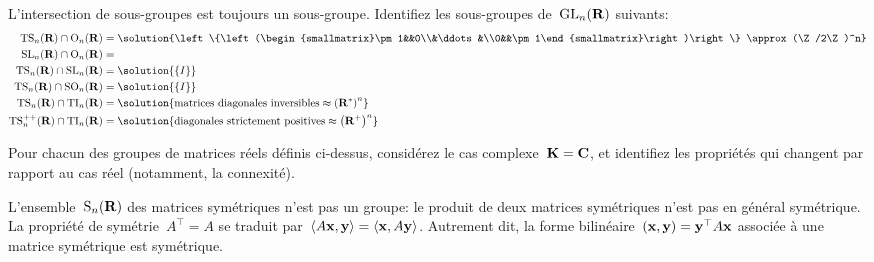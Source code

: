 \begin{exercice}
	L'intersection de sous-groupes est toujours un sous-groupe.  Identifiez
	les sous-groupes de~$\mathrm{GL}_n(\mathbf{R})$ suivants:
	\begin{align*}
		\TS_n(\R) \cap \OO_n(\R) &=
		\solution{\left\{\left(\begin{smallmatrix}\pm 1&&0\\&\ddots&\\0&&\pm
		1\end{smallmatrix}\right)\right\} \approx (\Z/2\Z)^n}\\
		\SL_n(\R) \cap \OO_n(\R) &= \\
		\TS_n(\R) \cap \SL_n(\R) &= \solution{\{I\}} \\
		\TS_n(\R) \cap \SO_n(\R) &= \solution{\{I\}} \\
		\TS_n(\R) \cap \TI_n(\R) &= \solution{\textrm{matrices diagonales
		inversibles} \approx \parens{\R^*}^n}\\
		\TS^{++}_n(\R) \cap \TI_n(\R) &= \solution{\textrm{diagonales strictement
		positives} \approx \parens{\R^+}^n}\\
	\end{align*}
\end{exercice}

\begin{exercice}
	Pour chacun des groupes de matrices réels définis ci-dessus, considérez le
	cas complexe~$\mathbf{K}=\mathbf{C}$, et identifiez les propriétés qui changent par rapport
	au cas réel (notamment, la connexité).
\end{exercice}

L'ensemble~$\mathrm{S}_n(\mathbf{R})$ des matrices symétriques n'est pas un groupe: le produit
de deux matrices symétriques n'est pas en général symétrique.  La propriété
de symétrie~$A^\top=A$ se traduit par~$\left\langle A\mathbf{x},\mathbf{y}\right\rangle=\left\langle \mathbf{x},A\mathbf{y}\right\rangle$.
Autrement dit, la forme bilinéaire~$(\mathbf{x},\mathbf{y})=\mathbf{y}^\top A\mathbf{x}$
associée à une matrice symétrique est symétrique.

